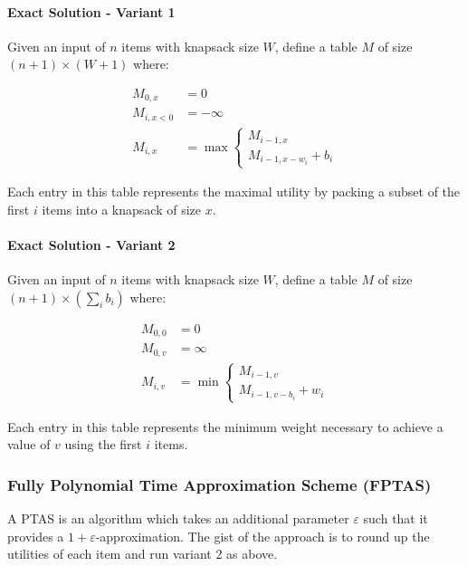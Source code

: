 \documentclass{idc_msc}
\begin{document}
\paragraph{Exact Solution - Variant 1}

Given an input of \(n\) items with knapsack size \(W\), define a table \(M\) of size \((n+1) \times (W+1)\) where:

\[
\begin{aligned}
M_{0,x} &= 0 \\
M_{i,x<0} &= -\infty \\
M_{i,x} &= \max \begin{cases}M_{i-1,x} \\ M_{i-1, x-w_i} + b_i\end{cases}
\end{aligned}
\]

Each entry in this table represents the maximal utility by packing a subset of the first \(i\) items into a knapsack of size \(x\).

\paragraph{Exact Solution - Variant 2}

Given an input of \(n\) items with knapsack size \(W\), define a table \(M\) of size \((n+1) \times (\sum_i b_i)\) where:

\[
\begin{aligned}
M_{0,0} &= 0 \\
M_{0,v} &= \infty \\
M_{i,v} &= \min \begin{cases} M_{i-1,v} \\ M_{i-1,v-b_i} + w_i \end{cases}
\end{aligned}
\]

Each entry in this table represents the minimum weight necessary to achieve a value of \(v\) using the first \(i\) items.

\subsubsection{Fully Polynomial Time Approximation Scheme (FPTAS)}

A PTAS is an algorithm which takes an additional parameter \(\varepsilon\) such that it provides a \(1+\varepsilon\)-approximation.
The gist of the approach is to round up the utilities of each item and run variant 2 as above.
\end{document}
